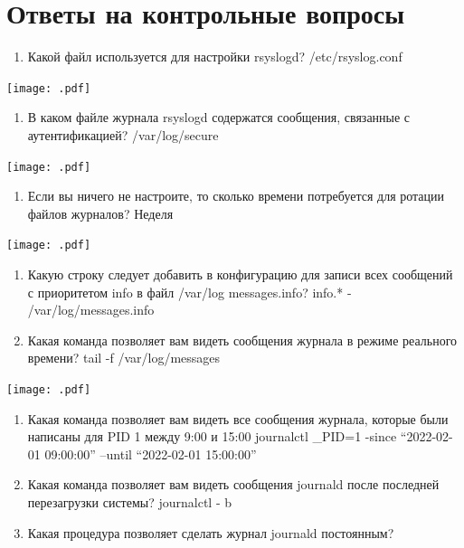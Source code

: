 \documentclass[
  english,
  russian,
  12pt,
  a4paper,
  DIV=11,
  numbers=noendperiod]{scrreprt}
\providecommand{\tightlist}{%
  \setlength{\itemsep}{0pt}\setlength{\parskip}{0pt}}
\begin{document}
\section{Ответы на контрольные
вопросы}\label{ux43eux442ux432ux435ux442ux44b-ux43dux430-ux43aux43eux43dux442ux440ux43eux43bux44cux43dux44bux435-ux432ux43eux43fux440ux43eux441ux44b}

\begin{enumerate}
\def\labelenumi{\arabic{enumi}.}
\tightlist
\item
  Какой файл используется для настройки rsyslogd? /etc/rsyslog.conf
\end{enumerate}

\texttt{[image: .pdf]}

\begin{enumerate}
\def\labelenumi{\arabic{enumi}.}
\setcounter{enumi}{1}
\tightlist
\item
  В каком файле журнала rsyslogd содержатся сообщения, связанные с
  аутентификацией? /var/log/secure
\end{enumerate}

\texttt{[image: .pdf]}

\begin{enumerate}
\def\labelenumi{\arabic{enumi}.}
\setcounter{enumi}{2}
\tightlist
\item
  Если вы ничего не настроите, то сколько времени потребуется для
  ротации файлов журналов? Неделя
\end{enumerate}

\texttt{[image: .pdf]}

\begin{enumerate}
\def\labelenumi{\arabic{enumi}.}
\setcounter{enumi}{3}
\item
  Какую строку следует добавить в конфигурацию для записи всех сообщений
  с приоритетом info в файл /var/log messages.info? info.* -
  /var/log/messages.info
\item
  Какая команда позволяет вам видеть сообщения журнала в режиме
  реального времени? tail -f /var/log/messages
\end{enumerate}

\texttt{[image: .pdf]}

\begin{enumerate}
\def\labelenumi{\arabic{enumi}.}
\setcounter{enumi}{5}
\item
  Какая команда позволяет вам видеть все сообщения журнала, которые были
  написаны для PID 1 между 9:00 и 15:00 journalctl \_PID=1 -since
  \enquote{2022-02-01 09:00:00} --until \enquote{2022-02-01 15:00:00}
\item
  Какая команда позволяет вам видеть сообщения journald после последней
  перезагрузки системы? journalctl - b
\item
  Какая процедура позволяет сделать журнал journald постоянным?
\end{enumerate}
\end{document}
